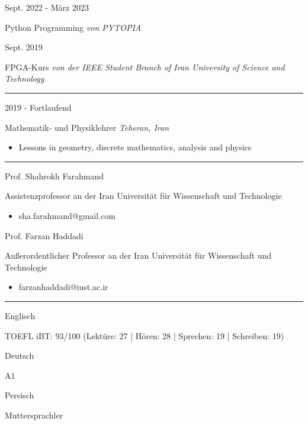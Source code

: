 \documentclass[a4paper,10pt]{article}
\newlength{\cvcolumngapwidth}
\newlength{\cvleftcolumnwidth}
\newlength{\cvrightcolumnwidth}
\newcommand{\cvsectionstyle}[1]{{\normalsize\cvsectionfont\textcolor{cvsectioncolor}{#1}}}
\newcommand{\cvtitlestyle}[1]{{\large\cvtitlefont\textcolor{cvtitlecolor}{#1}}}
\newcommand{\cvdurationstyle}[1]{{\small\cvdurationfont\textcolor{cvdurationcolor}{#1}}}
\newcommand{\cvheadingstyle}[1]{{\normalsize\cvheadingfont\textcolor{cvheadingcolor}{#1}}}
\newlength{\cvafteritemskipamount}
\newlength{\cvaftersectionskipamount}
\newlength{\cvbetweensectionandheadingextraskipamount}
\newlength{\cvaftertitleskipamount}
\newlength{\cvparskip}
\newcommand{\cvsection}[1]{
    \begin{minipage}[t]{\cvleftcolumnwidth}
        \raggedleft\cvsectionstyle{#1}
    \end{minipage}%
    \hspace{\cvcolumngapwidth}%
    \begin{minipage}[t]{\cvrightcolumnwidth}
        \textcolor{cvrulecolor}{\rule{\cvrightcolumnwidth}{0.3mm}}
    \end{minipage}

    \vspace{\cvaftersectionskipamount}
}
\newcommand{\cvitem}[2]{
    \begin{minipage}[t]{\cvleftcolumnwidth}
        \raggedleft #1
    \end{minipage}%
    \hspace{\cvcolumngapwidth}%
    \begin{minipage}[t]{\cvrightcolumnwidth}
        \setlength{\parskip}{\cvparskip} #2
    \end{minipage}

    \vspace{\cvafteritemskipamount}
}
\newcommand{\cvtitle}[1]{
    \cvtitlestyle{#1}

    \vspace{\cvaftertitleskipamount}
    \vspace{-\cvparskip}
}
\begin{document}
\vspace{-4mm}
\cvitem{
    \cvdurationstyle{Sept. 2022 - März 2023}
}{
    \cvtitle{{Python Programming} \textit{\small{von PYTOPIA}}}
}

\vspace{-4mm}
\cvitem{
    \cvdurationstyle{Sept. 2019}
}{
    \cvtitle{{FPGA-Kurs} \textit{\small{von der IEEE Student Branch of Iran University of Science and Technology}}}
}

\cvsection{FREIWILLIGENARBEIT}
\cvitem{
    \cvdurationstyle{2019 - Fortlaufend}
}{
    \cvtitle{{Mathematik- und Physiklehrer} \hfill{\textnormal{\textit{Teheran, Iran}}}}
    {}
    \begin{itemize}[leftmargin=*]
        \item Lessons in geometry, discrete mathematics, analysis and physics
    \end{itemize}
}

\cvsection{VERWEISE}
\vspace{\cvbetweensectionandheadingextraskipamount}
\cvitem{
    \cvheadingstyle{Prof. Shahrokh Farahmand}
}{
    {Assistenzprofessor an der Iran Universität für Wissenschaft und Technologie}
    \begin{itemize}[leftmargin=*]
        \item sha.farahmand@gmail.com
    \end{itemize}
}
\vspace{-4mm}
\cvitem{
    \cvheadingstyle{Prof. Farzan Haddadi}
}{
    {Außerordentlicher Professor an der Iran Universität für Wissenschaft und Technologie}
    \begin{itemize}[leftmargin=*]
        \item farzanhaddadi@iust.ac.ir
    \end{itemize}
}

\cvsection{SPRACHEN}
\vspace{\cvbetweensectionandheadingextraskipamount}
\cvitem{
    \cvheadingstyle{Englisch}
}{
    {TOEFL iBT: 93/100 (Lektüre: 27 | Hören: 28 | Sprechen: 19 | Schreiben: 19)}
}
\vspace{-4mm}
\cvitem{
    \cvheadingstyle{Deutsch}
}{
    A1

}
\vspace{-4mm}
\cvitem{
    \cvheadingstyle{Persisch}
}{
    Muttersprachler

}
\end{document}
